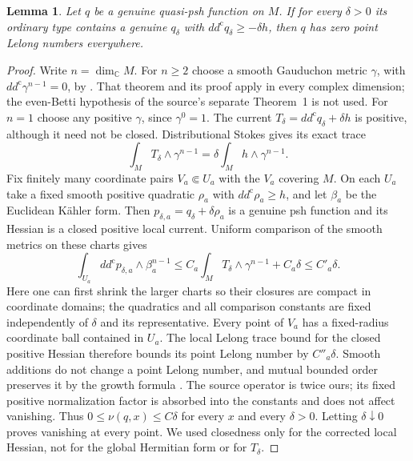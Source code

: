 \documentclass[11pt]{article}
\newtheorem{lemma}[theorem]{Lemma}
\theoremstyle{remark}
\newcommand{\ddc}{dd^{\mathrm c}}
\begin{document}
\begin{lemma}\label{lem:automatic}
Let $q$ be a genuine quasi-psh function on $M$. If for every $\delta>0$
its ordinary type contains a genuine $q_\delta$ with
$\ddc q_\delta\geq-\delta h$, then $q$ has zero point Lelong numbers
everywhere.
\end{lemma}
\begin{proof}
Write $n=\dim_{\mathbb C}M$. For $n\geq2$ choose a smooth Gauduchon
metric $\gamma$, with $\ddc\gamma^{n-1}=0$, by
\cite[Theorem~2]{Gauduchon}. That theorem and its proof apply in every
complex dimension; the even-Betti hypothesis of the source's separate
Theorem~1 is not used. For $n=1$ choose any positive $\gamma$, since
$\gamma^0=1$. The current $T_\delta=\ddc q_\delta+\delta h$ is positive,
although it need not be closed. Distributional Stokes gives its exact trace
\[
 \int_M T_\delta\wedge\gamma^{n-1}
       =\delta\int_M h\wedge\gamma^{n-1}.
\]
Fix finitely many coordinate pairs $V_a\Subset U_a$ with the $V_a$
covering $M$. On each $U_a$ take a fixed smooth positive quadratic
$\rho_a$ with $\ddc\rho_a\geq h$, and let $\beta_a$ be the Euclidean
K\"ahler form. Then $p_{\delta,a}=q_\delta+\delta\rho_a$ is a genuine
psh function and its Hessian is a closed positive local current. Uniform
comparison of the smooth metrics on these charts gives
\[
 \int_{U_a}\ddc p_{\delta,a}\wedge\beta_a^{n-1}
 \leq C_a\int_M T_\delta\wedge\gamma^{n-1}+C_a\delta
 \leq C'_a\delta.
\]
Here one can first shrink the larger charts so their closures are compact
in coordinate domains; the quadratics and all comparison constants are
fixed independently of $\delta$ and its representative. Every point of
$V_a$ has a fixed-radius coordinate ball contained in $U_a$.
The local Lelong trace bound
\cite[III.5.5--5.8]{DemaillyBook} for the closed positive Hessian therefore
bounds its point Lelong number by $C''_a\delta$. Smooth additions do not
change a point Lelong number, and mutual bounded order preserves it by
the growth formula \cite[III.6.9(c)]{DemaillyBook}. The source operator is
twice ours; its fixed positive normalization factor is absorbed into the
constants and does not affect vanishing. Thus $0\leq\nu(q,x)\leq C\delta$
for every $x$ and every $\delta>0$. Letting $\delta\downarrow0$ proves
vanishing at every point. We used closedness only for the corrected local
Hessian, not for the global Hermitian form or for $T_\delta$.
\end{proof}
\end{document}
